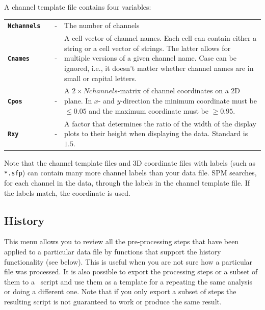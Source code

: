 A channel template file contains four variables:\\

\begin{tabular}{llcp{9cm}}

{\bf \texttt{Nchannels}} & &  - & The number of channels\\

{\bf \texttt{Cnames}}&  & - & A cell vector of channel names. Each cell can contain either a string or a cell vector of strings. The latter allows
for multiple versions of a given channel name. Case can be ignored, i.e., it doesn't matter whether channel names are in small or capital letters.\\

{\bf \texttt{Cpos}} & & - & A $2 \times Nchannels$-matrix of channel coordinates on a 2D plane. In $x$- and $y$-direction the minimum coordinate must be $\leq 0.05$ and the maximum coordinate must be $\geq 0.95$. \\

{\bf \texttt{Rxy}} & & - & A factor that determines the ratio of the width of the display plots to their height when displaying the data. Standard is $1.5$. \\

\end{tabular}

Note that the channel template files and 3D coordinate files with labels (such as \texttt{*.sfp}) can contain many more channel labels than your data file. SPM searches, for each channel in the data, through the labels in the channel template file. If the labels match, the coordinate is used.

\subsection{History}
This menu allows you to review all the pre-processing steps that have been applied to a particular data file by functions that support the history functionality (see below). This is useful when you are not sure how a particular file was processed. It is also possible to export the processing steps or a subset of them to a \matlab\ script and use them as a template for a repeating the same analysis or doing a different one. Note that if you only export a subset of steps the resulting script is not guaranteed to work or produce the same result.

